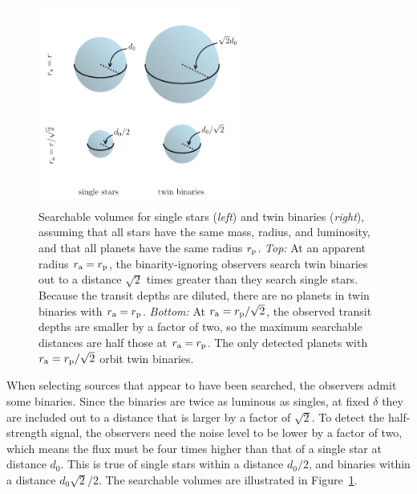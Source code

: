 \documentclass[12pt,modern]{aastex61}
\renewcommand{\a}{_{\rm a}}
\newcommand{\p}{_{\rm p}}
\begin{document}
\begin{figure}[!tb]
    \begin{center}
        \includegraphics[width=0.6\textwidth]{figures/visualize_volumes.pdf}
    \end{center}
    \caption{
        Searchable volumes for single stars ({\it left}) and twin
        binaries ({\it right}), assuming that all stars have the same
        mass, radius, and luminosity, and that all planets have the
        same radius $r\p$.
        {\it Top:} At an apparent radius $r\a=r\p$, the
        binarity-ignoring observers search twin binaries out to a
        distance $\sqrt{2}$ times greater than they search single
        stars.  Because the transit depths are diluted, there are no 
        planets in twin binaries with $r\a=r\p$.
        {\it Bottom:} At $r\a=r\p/\sqrt{2}$, the observed transit
        depths are smaller by a factor of two, so the maximum
        searchable distances are half those at $r\a=r\p$.  The only
        detected planets with $r\a=r\p/\sqrt{2}$ orbit twin binaries.
    }
    \label{fig:model_1_volumes}
\end{figure}

When selecting sources that appear to have been searched, the
observers admit some binaries.  Since the binaries are twice as
luminous as singles, at fixed $\delta$ they are included out to a
distance that is larger by a factor of $\sqrt{2}$.  To detect the
half-strength signal, the observers need the noise level to be lower
by a factor of two, which means the flux must be four times higher
than that of a single star at distance $d_0$.  This is true of single
stars within a distance $d_0/2$, and binaries within a distance
$d_0\sqrt{2}/2$.  The searchable volumes are illustrated in
Figure~\ref{fig:model_1_volumes}.
\end{document}
